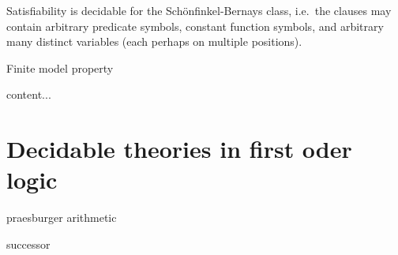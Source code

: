 \begin{lemma}\label{lem:schoenfinkel}
	Satisfiability is decidable for the Schönfinkel-Bernays class, 
	i.e.~the clauses
	may contain arbitrary predicate symbols, 
	constant function symbols, 
	and arbitrary many distinct variables 
	(each perhaps on multiple positions).
	
\end{lemma}

\begin{lemma}
\end{lemma}





\begin{definition}Finite model property
\end{definition}


\begin{theorem}
	content...
\end{theorem}



\section{Decidable theories in first oder logic}

praesburger arithmetic

successor



